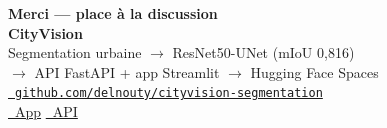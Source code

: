 \documentclass[aspectratio=169,11pt]{beamer}
\begin{document}
{
\hypersetup{urlcolor=white}
\begin{frame}[plain]
  \centering
  \vfill
  {\Large\textbf{Merci --- place à la discussion}}\\[1.2em]
  {\large\textbf{CityVision}}\\[0.5em]
  Segmentation urbaine $\rightarrow$ ResNet50-UNet (mIoU 0{,}816)\\[0.3em]
  $\rightarrow$ API FastAPI + app Streamlit $\rightarrow$ Hugging Face Spaces
  \vfill
  {\footnotesize\href{https://github.com/delnouty/cityvision-segmentation}{\color{white}\faGithub~\texttt{github.com/delnouty/cityvision-segmentation}}}\\[0.8em]
  {\footnotesize
    \href{https://huggingface.co/spaces/DaryaEL/cityvision}{\color{white}\faGlobe~App}
    \quad\textbar\quad
    \href{https://daryael-cityvision-api.hf.space/docs}{\color{white}\faServer~API}}
  \vfill
\end{frame}
}
\end{document}
